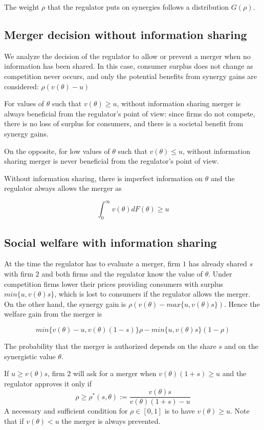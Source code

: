 \documentclass[a4paper,leqno]{article}%
\renewcommand{\t}{\theta}
\renewcommand{\t}{\theta}
\begin{document}
The weight $\rho$ that the regulator puts on synergies follows a distribution $G(\rho)$.


\subsection{Merger decision without information sharing}

We analyze the decision of the regulator to allow or prevent a merger when no information has been shared. In this case, consumer surplus does not change as competition never occurs, and only the potential benefits from synergy gains are considered: $\rho (v(\t)-u)$

For values of $\t$ such that $v(\t)\geq u$, without information sharing merger is always beneficial from the regulator's point of view: since firms do not compete, there is no loss of surplus for consumers, and there is a societal benefit from synergy gains.

On the opposite, for low values of $\t$ such that $v(\t)\leq u$, without information sharing merger is never beneficial from the regulator's point of view.

Without information sharing, there is imperfect information on $\t$ and the regulator always allows the merger as 

\[
\int_{0}^{\infty}v(\t)dF(\t)\geq u
\]

\medskip

\subsection{Social welfare with information sharing}

\medskip

At the time the regulator has to evaluate a merger, firm $1$ has already shared $s$ with firm $2$ and both firms and the regulator know the value of $\t$. Under competition firms lower their prices providing consumers with surplus $min\{u,v(\t)s\}$, which is lost to consumers if the regulator allows the merger. On the other hand, the synergy gain is $\rho (v(\t)-max\{u,v(\t)s\})$. Hence the welfare gain from the merger is

\[
min\{v(\t)-u,v(\t)(1-s)\}\rho-min\{u,v(\t)s\}(1-\rho)
\]




The probability that the merger is authorized depends on the share $s$ and on the synergistic value $\t$. 

If $u\geq v(\t)s$, firm 2 will ask for a merger when $v(\t)(1+s)\geq u$ and the regulator approves it only if  
    \begin{equation}
           \rho\geq \rho^*(s,\t):=\frac{v(\t)s}{v(\t)(1+s)-u}
    \end{equation}
A necessary and sufficient condition for $\rho\in[0,1]$ is to have $v(\t)\geq u$. Note that if $v(\t)<u$ the merger is always prevented.
\end{document}
